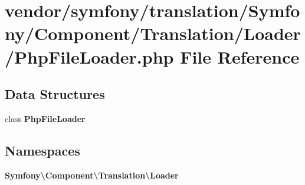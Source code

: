 \section{vendor/symfony/translation/\+Symfony/\+Component/\+Translation/\+Loader/\+Php\+File\+Loader.php File Reference}
\label{translation_2_symfony_2_component_2_translation_2_loader_2_php_file_loader_8php}
\subsection*{Data Structures}
\begin{DoxyCompactItemize}
\item 
class {\bf Php\+File\+Loader}
\end{DoxyCompactItemize}
\subsection*{Namespaces}
\begin{DoxyCompactItemize}
\item 
 {\bf Symfony\textbackslash{}\+Component\textbackslash{}\+Translation\textbackslash{}\+Loader}
\end{DoxyCompactItemize}
